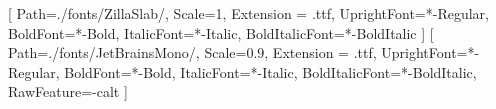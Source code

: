 
\setmainfont{ZillaSlab}[
	Path=./fonts/ZillaSlab/,
	Scale=1,
	Extension = .ttf,
	UprightFont=*-Regular,
	BoldFont=*-Bold,
	ItalicFont=*-Italic,
	BoldItalicFont=*-BoldItalic
]
\setmonofont{JetBrainsMono}[
	Path=./fonts/JetBrainsMono/,
	Scale=0.9,
	Extension = .ttf,
	UprightFont=*-Regular,
	BoldFont=*-Bold,
	ItalicFont=*-Italic,
	BoldItalicFont=*-BoldItalic,
	RawFeature=-calt
]
